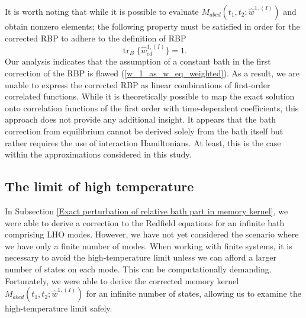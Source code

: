 It is worth noting that while it is possible to evaluate $M_{abcd}(t_1, t_2; \hat{w}^{1,(I)})$ and obtain nonzero elements; the following property must be satisfied in order for the corrected RBP to adhere to the definition of RBP
\begin{equation}
    \operatorname{tr}_B \{ \hat{w}_{cd}^{1,(I)}\} = 1.
\end{equation}
Our analysis indicates that the assumption of a constant bath in the first correction of the RBP is flawed (\ref{w_1_as_w_eq_weighted}). As a result, we are unable to express the corrected RBP as linear combinations of first-order correlated functions. While it is theoretically possible to map the exact solution onto correlation functions of the first order with time-dependent coefficients, this approach does not provide any additional insight. It appears that the bath correction from equilibrium cannot be derived solely from the bath itself but rather requires the use of interaction Hamiltonians. At least, this is the case within the approximations considered in this study.

\subsection{The limit of high temperature}
\label{Limit of high temperatures}

In Subsection \ref{Exact perturbation of relative bath part in memory kernel}, we were able to derive a correction to the Redfield equations for an infinite bath comprising LHO modes. However, we have not yet considered the scenario where we have only a finite number of modes. When working with finite systems, it is necessary to avoid the high-temperature limit unless we can afford a larger number of states on each mode. This can be computationally demanding. Fortunately, we were able to derive the corrected memory kernel $M_{abcd}(t_1, t_2; \hat{w}^{1,(I)})$ for an infinite number of states, allowing us to examine the high-temperature limit safely. 

